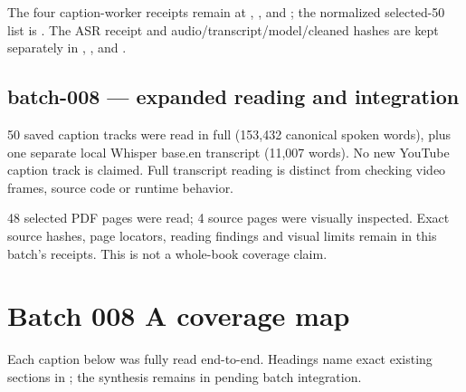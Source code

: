 The four caption-worker receipts remain at , , and ; the normalized selected-50 list is . The ASR receipt and audio/transcript/model/cleaned hashes are kept separately in , , and .

\subsection{batch-008 --- expanded reading and integration}\label{appendix-877738f6f4d2-batch-008-expanded-reading-and-integration}

\hypertarget{appendix-877738f6f4d2-batch-008-expanded-reading-and-integration}{}

50 saved caption tracks were read in full (153,432 canonical spoken words), plus one separate local Whisper base.en transcript (11,007 words). No new YouTube caption track is claimed. Full transcript reading is distinct from checking video frames, source code or runtime behavior.

48 selected PDF pages were read; 4 source pages were visually inspected. Exact source hashes, page locators, reading findings and visual limits remain in this batch's receipts. This is not a whole-book coverage claim.

\section{Batch 008 A coverage map}\label{appendix-877738f6f4d2-batch-008-a-coverage-map}

\hypertarget{appendix-877738f6f4d2-batch-008-a-coverage-map}{}

Each caption below was fully read end-to-end. Headings name exact existing sections in ; the synthesis remains in  pending batch integration.

